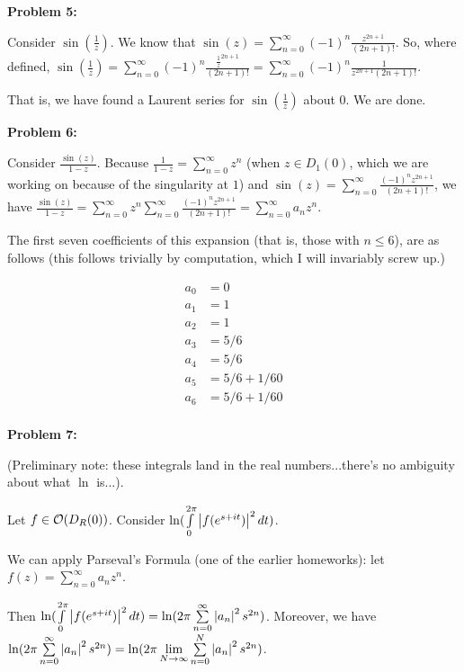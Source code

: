 \documentclass[a4paper,12pt]{article}
\begin{document}
\shunt

{\bf Problem 5:}

Consider $\sin(\frac{1}{z})$. We know that $\sin(z) = \sum\limits_{n=0}^\infty (-1)^n \frac{z^{2n+1}}{(2n+1)!}$. So, where defined, $\sin(\frac{1}{z}) = \sum\limits_{n=0}^\infty (-1)^n \frac{\frac{1}{z}^{2n+1}}{(2n+1)!} = \sum\limits_{n=0}^\infty (-1)^n \frac{1}{z^{2n+1}(2n+1)!}$.

That is, we have found a Laurent series for $\sin(\frac{1}{z})$ about $0$. We are done.

\shunt

{\bf Problem 6:}

Consider $\frac{\sin(z)}{1-z}$. Because $\frac{1}{1-z} = \sum\limits_{n=0}^\infty z^n$ (when $z \in D_1(0)$, which we are working on because of the singularity at $1$) and $\sin(z) = \sum\limits_{n=0}^\infty \frac{(-1)^n z^{2n+1}}{(2n+1)!}$, we have $\frac{\sin(z)}{1-z} = \sum\limits_{n=0}^\infty z^n \sum\limits_{n=0}^\infty \frac{(-1)^n z^{2n+1}}{(2n+1)!} = \sum\limits_{n=0}^\infty a_nz^n$.

The first seven coefficients of this expansion (that is, those with $n \leq 6$), are as follows (this follows trivially by computation, which I will invariably screw up.)

\begin{align*}
a_0 &= 0\\
a_1 &= 1\\
a_2 &= 1\\
a_3 &= 5/6\\
a_4 &= 5/6\\
a_5 &= 5/6 + 1/60\\
a_6 &= 5/6 + 1/60\\
\end{align*}

\shunt

{\bf Problem 7:}

(Preliminary note: these integrals land in the real numbers...there's no ambiguity about what $\ln$ is...).

Let $f \in \mathcal{O}(D_R(0))$. Consider $\ln(\int\limits_0^{2\pi} \left\lvert f(e^{s+it}) \right\rvert^2 dt)$.

We can apply Parseval's Formula (one of the earlier homeworks): let $f(z) = \sum\limits_{n=0}^\infty a_n z^n$.

Then $\ln( \int\limits_0^{2\pi} \left\lvert f(e^{s+it}) \right\rvert^2 dt) = \ln(2\pi \sum\limits_{n=0}^\infty \left\lvert a_n \right\rvert^2 s^{2n})$. Moreover, we have $\ln(2\pi \sum\limits_{n=0}^\infty \left\lvert a_n \right\rvert^2 s^{2n}) =  \ln(2\pi \lim\limits_{N \to \infty}\sum\limits_{n=0}^N \left\lvert a_n \right\rvert^2 s^{2n})$. 
\end{document}
